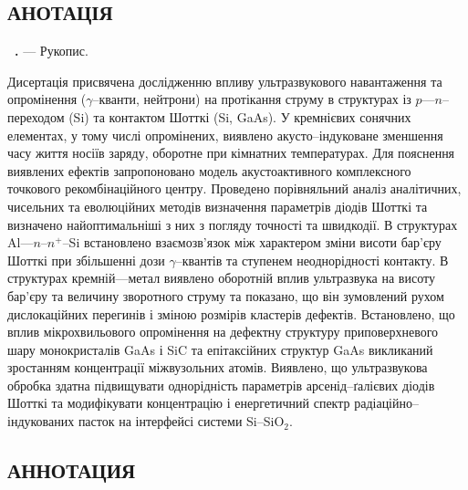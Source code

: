 
\vspace{1.5em}
\begin{center}
\section*{\MakeUppercase{анотація}}
\end{center}

\vspace{-1.0em}

\textbf{\thesisAuthorFIO~\thesisTitle.} --- Рукопис.

\abstractBegin

Дисертація присвячена дослідженню впливу ультразвукового навантаження та опромінення ($\gamma$--кванти, нейтрони)
на протікання струму в структурах із $p$---$n$--переходом (Si) та контактом Шотткі (Si, GaAs).
У кремнієвих сонячних елементах, у тому числі опромінених,
 виявлено акусто--індуковане зменшення часу життя носіїв заряду, оборотне при кімнатних температурах.
 Для пояснення виявлених ефектів запропоновано модель акустоактивного комплексного точкового рекомбінаційного центру.
 Проведено порівняльний аналіз аналітичних, чисельних та еволюційних методів визначення параметрів діодів Шотткі
 та визначено найоптимальніші з них з погляду точності та швидкодії.
 В структурах Al---$n$--$n^+$--Si встановлено взаємозв'язок між характером зміни висоти бар'єру Шотткі при збільшенні дози $\gamma$--квантів та ступенем неоднорідності контакту.
 В структурах кремній---метал виявлено оборотній вплив ультразвука на висоту бар'єру та величину зворотного струму та показано, що він зумовлений рухом дислокаційних перегинів і зміною розмірів кластерів дефектів.
 Встановлено, що вплив мікрохвильового опромінення на дефектну структуру приповерхневого шару монокристалів GaAs і SiC та епітаксійних структур GaAs
 викликаний зростанням концентрації міжвузольних атомів.
 Виявлено, що ультразвукова обробка здатна підвищувати однорідність параметрів арсенід--ґалієвих діодів Шотткі та модифікувати концентрацію і енергетичний спектр радіаційно--індукованих пасток  на інтерфейсі системи  Si--SiO$_2$.

\keywords

\vspace{2.5em}

\begin{center}
{\section*{\MakeUppercase{АННОТАЦИЯ}}}
\end{center}

